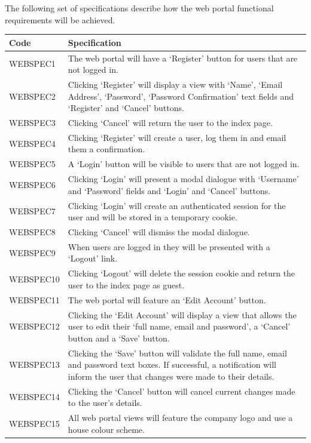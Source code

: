 \documentclass[11pt,a4paper]{article}
\begin{document}
The following set of specifications describe how the web portal functional requirements will be achieved.

\begin{longtable}{|p{2.5cm}p{13cm}|}
\hline
\textbf{Code} & \textbf{Specification} \\

\hline
WEBSPEC1 & The web portal will have a `Register' button for users that are not logged in. \\ \hline
WEBSPEC2 & Clicking `Register' will display a view with `Name', `Email Address', `Password', `Password Confirmation' text fields and `Register' and `Cancel' buttons.\\ \hline
WEBSPEC3 & Clicking `Cancel' will return the user to the index page.\\ \hline
WEBSPEC4 & Clicking `Register' will create a user, log them in and email them a confirmation. \\ \hline
WEBSPEC5 & A `Login' button will be visible to users that are not logged in.\\ \hline
WEBSPEC6 & Clicking `Login' will present a modal dialogue with `Username' and `Password' fields and `Login' and `Cancel' buttons. \\ \hline
WEBSPEC7 & Clicking `Login' will create an authenticated session for the user and will be stored in a temporary cookie.\\ \hline
WEBSPEC8 & Clicking `Cancel' will dismiss the modal dialogue. \\ \hline
WEBSPEC9 & When users are logged in they will be presented with a `Logout' link.\\ \hline
WEBSPEC10 & Clicking `Logout' will delete the session cookie and return the user to the index page as guest. \\ \hline
WEBSPEC11 & The web portal will feature an `Edit Account' button. \\ \hline
WEBSPEC12 & Clicking the `Edit Account' will display a view that allows the user to edit their `full name, email and password', a `Cancel' button and a `Save' button. \\ \hline
WEBSPEC13 & Clicking the `Save' button will validate the full name, email and password text boxes. If successful, a notification will inform the user that changes were made to their details. \\ \hline
WEBSPEC14 & Clicking the `Cancel' button will cancel current changes made to the user's details. \\ \hline
WEBSPEC15 & All web portal views will feature the company logo and use a house colour scheme. \\ \hline

\end{longtable}
\end{document}

